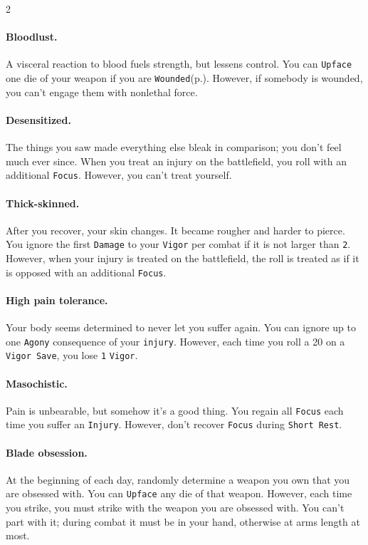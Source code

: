 

\label{sec:quirks}

\begin{multicols*}{2}

\paragraph{Bloodlust.} A visceral reaction to blood fuels strength, but lessens control.
You can \texttt{Upface} one die of your weapon if you are \texttt{Wounded}(p.\pageref*{sec:wounded}). However, if somebody is wounded, you can't engage them with nonlethal force.

\paragraph{Desensitized.} The things you saw made everything else bleak in comparison; you don't feel much ever since.
When you treat an injury on the battlefield, you roll with an additional \texttt{Focus}. However, you can't treat yourself.

\paragraph{Thick-skinned.} After you recover, your skin changes. It became rougher and harder to pierce.
You ignore the first \texttt{Damage} to your \texttt{Vigor} per combat if it is not larger than \texttt{2}.
However, when your injury is treated on the battlefield, the roll is treated as if it is opposed with an additional \texttt{Focus}.

\paragraph{High pain tolerance.} Your body seems determined to never let you suffer again.
You can ignore up to one \texttt{Agony} consequence of your \texttt{injury}.
However, each time you roll a 20 on a \texttt{Vigor Save}, you lose \texttt{1} \texttt{Vigor}.

\paragraph{Masochistic.} Pain is unbearable, but somehow it's a good thing. You regain all \texttt{Focus} each time you suffer an \texttt{Injury}.
However, don't recover \texttt{Focus} during \texttt{Short Rest}.

\paragraph{Blade obsession.} At the beginning of each day, randomly determine a weapon you own that you are obsessed with.
You can \texttt{Upface} any die of that weapon. However, each time you strike, you must strike with the weapon you are obsessed with.
You can't part with it; during combat it must be in your hand, otherwise at arms length at most.


\end{multicols*}

